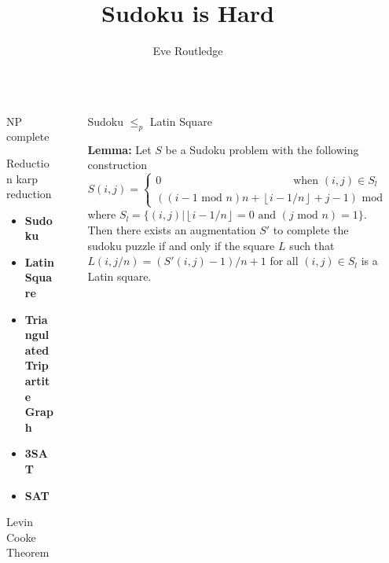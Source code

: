 \documentclass[final]{beamer}
\title{Sudoku is Hard}
\author{Eve Routledge}
\institute[shortinst]{Durham University}
\newlength{\sepwidth}
\newlength{\colwidth}
\newcounter{col}
\newcommand{\separatorcolumn}{\begin{column}{\sepwidth}\end{column}}
\begin{document}
\begin{frame}[t]
\begin{columns}[t]
\separatorcolumn

\begin{column}{\colwidth}

  \begin{block}{NP complete}


  \end{block}
  \begin{block}{Reduction}
karp reduction

    \begin{itemize}
      \item \textbf{Sudoku }
      \item \textbf{Latin Square}
      \item \textbf{Triangulated Tripartite Graph}
	\item \textbf{3SAT}
	\item \textbf{SAT}
    \end{itemize}


  \end{block}
  \begin{alertblock}{Levin Cooke Theorem}

  \end{alertblock}
\end{column}

\separatorcolumn

\begin{column}{\colwidth}
  \begin{block}{Sudoku $\leq_p$ Latin Square}

\textbf{Lemma:} Let $S$ be a Sudoku problem with the following construction 
\begin{equation}
	S(i,j) =\begin{cases}
0 \qquad\qquad\qquad\qquad\qquad\qquad\text{when } (i,j) \in S_l \\ 
((i-1 \text{ mod } n)n + \left\lfloor{i-1/n}\right\rfloor+j-1)\text{ mod } n^2 +1 \quad\text{otherwise}
\end{cases}
\end{equation}
where $S_l=\{(i,j)| \left\lfloor{i-1/n}\right\rfloor=0 \text{ and }(j \text{ mod }n)=1\}$. Then there exists an augmentation $S'$ to complete the sudoku puzzle if and only if the square $L$ such that $L(i,j/n)=(S'(i,j)-1)/n+1$ for all $(i,j) \in S_l$ is a Latin square.

\begin{tikzpicture}[scale=.5]


\end{tikzpicture}
\end{block}
\end{column}
\end{columns}
\end{frame}
\end{document}
